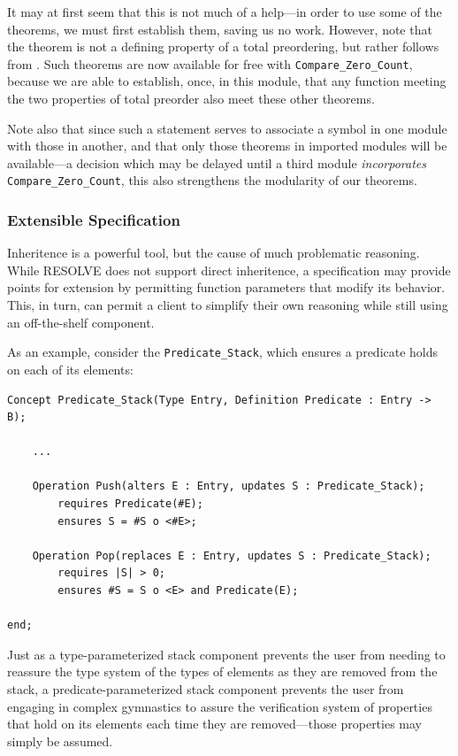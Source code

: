 It may at first seem that this is not much of a help---in order to use some of the theorems, we must first establish them, saving us no work.  However, note that the \texttt{} theorem is not a defining property of a total preordering, but rather follows from \texttt{\totalTheorem}.  Such theorems are now available for free with \texttt{Compare\_Zero\_Count}, because we are able to establish, once, in this module, that any function meeting the two properties of total preorder also meet these other theorems.

Note also that since such a statement serves to associate a symbol in one module with those in another, and that only those theorems in imported modules will be available---a decision which may be delayed until a third module \emph{incorporates} \texttt{Compare\_Zero\_Count}, this also strengthens the modularity of our theorems.

		\subsubsection{Extensible Specification\label{extensibleSpecification}}

Inheritence is a powerful tool, but the cause of much problematic reasoning\cite{something}.  While RESOLVE does not support direct inheritence, a specification may provide points for extension by permitting function parameters that modify its behavior.  This, in turn, can permit a client to simplify their own reasoning while still using an off-the-shelf component.

As an example, consider the \texttt{Predicate\_Stack}, which ensures a predicate holds on each of its elements:

\begin{lstlisting}
Concept Predicate_Stack(Type Entry, Definition Predicate : Entry -> B);

	...

	Operation Push(alters E : Entry, updates S : Predicate_Stack);
		requires Predicate(#E);
		ensures S = #S o <#E>;

	Operation Pop(replaces E : Entry, updates S : Predicate_Stack);
		requires |S| > 0;
		ensures #S = S o <E> and Predicate(E);

end;
\end{lstlisting}

Just as a type-parameterized stack component prevents the user from needing to reassure the type system of the types of elements as they are removed from the stack, a predicate-parameterized stack component prevents the user from engaging in complex gymnastics to assure the verification system of properties that hold on its elements each time they are removed---those properties may simply be assumed. 

